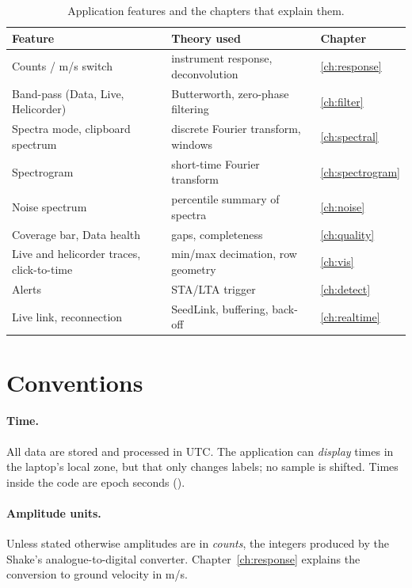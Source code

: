 \begin{table}[tbp]
\centering\small
\caption{Application features and the chapters that explain them.}\label{tab:map}
\begin{tabularx}{\linewidth}{@{}l X l@{}}
\toprule
Feature & Theory used & Chapter\\ \midrule
Counts / m/s switch & instrument response, deconvolution & \ref{ch:response}\\
Band-pass (Data, Live, Helicorder) & Butterworth, zero-phase filtering & \ref{ch:filter}\\
Spectra mode, clipboard spectrum & discrete Fourier transform, windows & \ref{ch:spectral}\\
Spectrogram & short-time Fourier transform & \ref{ch:spectrogram}\\
Noise spectrum & percentile summary of spectra & \ref{ch:noise}\\
Coverage bar, Data health & gaps, completeness & \ref{ch:quality}\\
Live and helicorder traces, click-to-time & min/max decimation, row geometry & \ref{ch:vis}\\
Alerts & STA/LTA trigger & \ref{ch:detect}\\
Live link, reconnection & SeedLink, buffering, back-off & \ref{ch:realtime}\\
\bottomrule
\end{tabularx}
\end{table}

\section{Conventions}
\paragraph{Time.} All data are stored and processed in UTC. The application can \emph{display} times in the
laptop's local zone, but that only changes labels; no sample is shifted. Times inside the code are epoch seconds
().

\paragraph{Amplitude units.} Unless stated otherwise amplitudes are in \emph{counts}, the integers produced by the
Shake's analogue-to-digital converter. Chapter~\ref{ch:response} explains the conversion to ground velocity in m/s.

